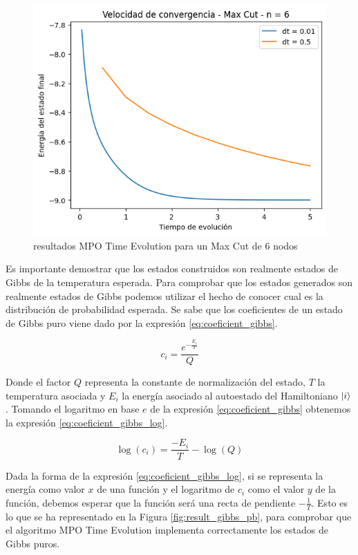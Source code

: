 \newpage

\begin{figure}[!h]
    \centering
    \includegraphics[scale = 0.7]{plt/a05-tevo_max_cut_n_6.png}
    \caption{resultados MPO Time Evolution para un Max Cut de 6 nodos}
    \label{fig:result_tevo}
\end{figure}

Es importante demostrar que los estados construidos son realmente estados de Gibbs de la temperatura esperada. Para comprobar que los estados generados son realmente estados de Gibbs podemos utilizar el hecho de conocer cual es la distribución de probabilidad esperada. Se sabe que los coeficientes de un estado de Gibbs puro viene dado por la expresión \ref{eq:coeficient_gibbs}.

\begin{equation}
c_{i} = \frac{e^{- \frac{E_{i}}{T}}}{Q}
\label{eq:coeficient_gibbs}
\end{equation}

Donde el factor $Q$ representa la constante de normalización del estado, $T$ la temperatura asociada y $E_{i}$ la energía asociado al autoestado del Hamiltoniano $\ket{i}$. Tomando el logaritmo en base $e$ de la expresión \ref{eq:coeficient_gibbs} obtenemos la expresión \ref{eq:coeficient_gibbs_log}.

\begin{equation}
\log(c_{i}) = \frac{- E_{i}}{T} - \log(Q)
\label{eq:coeficient_gibbs_log}
\end{equation}

Dada la forma de la expresión \ref{eq:coeficient_gibbs_log}, si se representa la energía como valor $x$ de una función y el logaritmo de $c_{i}$ como el valor $y$ de la función, debemos esperar que la función será una recta de pendiente $-\frac{1}{T}$. Esto es lo que se ha representado en la Figura \ref{fig:result_gibbs_pb}, para comprobar que el algoritmo MPO Time Evolution implementa correctamente los estados de Gibbs puros.

